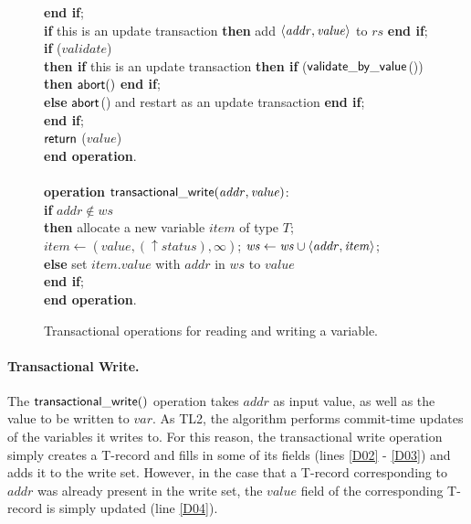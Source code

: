\begin{figure} [htb]
{{\begin{minipage}[t]{1\linewidth}
\begin{tabbing}
 \> {\bf end if}; \\

 \> {\bf if} this is an update transaction
                        {\bf then} add $\left \langle \mathit{addr,value} \right \rangle $ to $\mathit{rs}$ {\bf end if}; \\

 \> {\bf if} ($\mathit{validate}$) \\
 \>\> {\bf then if} this is an update transaction {\bf then if} (${\sf validate\_by\_value}$()) {\bf then} $\sf{abort}()$ {\bf end if}; \\
 \>\>\>\> {\bf else} ${\sf abort}$() and restart as an update transaction {\bf end if}; \\


 \> {\bf end if}; \\


 \> ${\sf return}$ ($\mathit{value}$) \\
{\bf end operation}. \\
\\
{\bf operation}  ${\sf transactional\_write}(\mathit{addr, value})$:\\%
 \> {\bf if} $\mathit{addr} \not\in \mathit{ws}$  \\
 \>\> {\bf then} \> allocate a new variable $item$ of type $T$; \\
 \>\>\> $\mathit{item}  \gets (\mathit{value, (\uparrow status), \infty})$; 
                   $\mathit{ws} \gets \mathit{ws} \cup \left \langle \mathit{addr, item} \right \rangle $; \\
 \>\> {\bf else} \> set $\mathit{item.value}$ with $\mathit{addr}$ in $\mathit{ws}$ to $\mathit{value}$ \\
 \> {\bf end if}; \\
{\bf end operation}.
\end{tabbing}
\normalsize
\end{minipage}
}
\caption{Transactional operations for reading and writing a variable.}
\label{fig:tops}
}
\end{figure}

\paragraph{Transactional Write.}
The ${\sf transactional\_write()}$ operation
takes $\mathit{addr}$ as input value, as well as the value 
to be written to $\mathit{var}$. As  TL2, the algorithm 
performs commit-time updates of the variables it writes to. 
For this reason, the transactional write  
operation simply creates a T-record and fills in some of its 
fields (lines \ref{D02} - \ref{D03}) and 
adds it to the write set.
However, in the case that a T-record corresponding to $\mathit{addr}$  was
already present in  the write set, the
$\mathit{value}$ field of the corresponding  
T-record is simply updated (line \ref{D04}).



